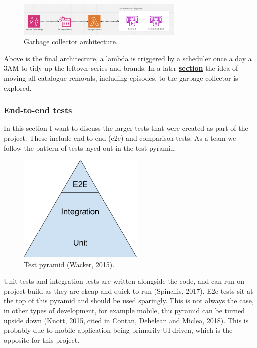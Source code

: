   \begin{figure}[H]
    \centering
    \includegraphics[width=8cm]{assets/architectures/garbageCollector.png}
    \caption{Garbage collector architecture.}
    \label{fig:garbageCollectorArchitecture}
  \end{figure}

  Above is the final architecture, a lambda is triggered by a scheduler once a day a 3AM to tidy up the leftover series and brands. In a later
  \hyperref[sec:garbageCollectorConsolidation]{\textbf{section}} the idea of moving all catalogue removals, including episodes, to the garbage 
  collector is explored.

  \newpage
  \subsubsection{End-to-end tests}
  In this section I want to discuss the larger tests that were created as part of the project. These include end-to-end (e2e) and comparison tests.
  As a team we follow the pattern of tests layed out in the test pyramid.

  \begin{figure}[H]
    \centering
    \includegraphics[width=6cm]{assets/testPyramid.png}
    \caption{Test pyramid (Wacker, 2015).}
    \label{fig:testPyramid}
  \end{figure}

  Unit tests and integration tests are written alongside the code, and can run on project build as they are cheap and quick to run (Spinellis, 2017).
  E2e tests sit at the top of this pyramid and should be used sparingly. This is not always the case, in other types of development, for example mobile,
  this pyramid can be turned upside down (Knott, 2015, cited in Contan, Dehelean and Miclea, 2018). This is probably due to mobile application being 
  primarily UI driven, which is the opposite for this project.

